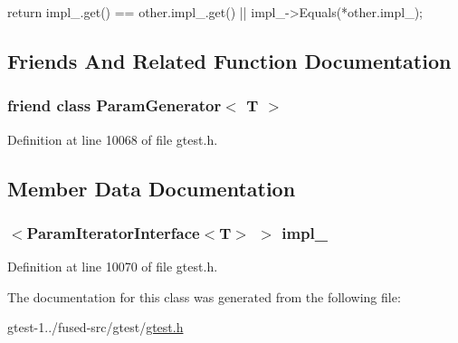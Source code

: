 \begin{DoxyCode}
                                                    {
    return impl_.get() == other.impl_.get() || impl_->Equals(*other.impl_);
  }
\end{DoxyCode}


\subsection{\-Friends \-And \-Related \-Function \-Documentation}
\hypertarget{classtesting_1_1internal_1_1ParamIterator_ab73a355ae191f2f7eab54b65ca557714}{
\subsubsection[{\-Param\-Generator$<$ T $>$}]{\setlength{\rightskip}{0pt plus 5cm}friend class {\bf \-Param\-Generator}$<$ \-T $>$}}\label{d0/ddb/classtesting_1_1internal_1_1ParamIterator_ab73a355ae191f2f7eab54b65ca557714}


\-Definition at line 10068 of file gtest.\-h.



\subsection{\-Member \-Data \-Documentation}
\hypertarget{classtesting_1_1internal_1_1ParamIterator_a865458fe18233eb7504aa2d66ba5f764}{
\subsubsection[{impl\-\_\-}]{$<${\bf \-Param\-Iterator\-Interface}$<$\-T$>$ $>$ {\bf impl\-\_\-}}}\label{d0/ddb/classtesting_1_1internal_1_1ParamIterator_a865458fe18233eb7504aa2d66ba5f764}


\-Definition at line 10070 of file gtest.\-h.



\-The documentation for this class was generated from the following file\-:\begin{DoxyCompactItemize}
\item 
gtest-\/1../fused-\/src/gtest/\hyperlink{fused-src_2gtest_2gtest_8h}{gtest.\-h}\end{DoxyCompactItemize}

